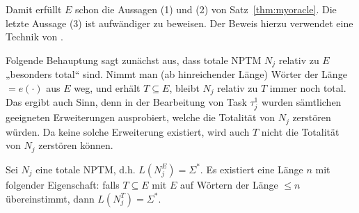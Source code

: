 Damit erfüllt $E$ schon die Aussagen (1) und (2) von Satz~\ref{thm:myoracle}. Die letzte Aussage (3) ist aufwändiger zu beweisen. Der Beweis hierzu verwendet eine Technik von \textcite[vgl.][Thm.~2.5]{fortnow_separability_2002}.

Folgende Behauptung sagt zunächst aus, dass totale NPTM $N_j$ relativ zu $E$ „besonders total“ sind. Nimmt man (ab hinreichender Länge) Wörter der Länge $=e(\cdot)$ aus $E$ weg, und erhält $T\subseteq E$, bleibt $N_j$ relativ zu $T$ immer noch total. Das ergibt auch Sinn, denn in der Bearbeitung von Task $\tau^1_j$ wurden sämtlichen geeigneten Erweiterungen ausprobiert, welche die Totalität von $N_j$ zerstören würden. Da keine solche Erweiterung existiert, wird auch $T$ nicht die Totalität von $N_j$ zerstören können.

\begin{claim}\label{claim:myoracle-totality}
    Sei $N_j$ eine totale NPTM, d.h. $L(N_j^E)=\Sigma^*$.
    Es existiert eine Länge $n$ mit folgender Eigenschaft: 
    falls $T\subseteq E$ mit $E$ auf Wörtern der Länge $\leq n$ übereinstimmt, dann $L(N_j^T)=\Sigma^*$.
\end{claim}
